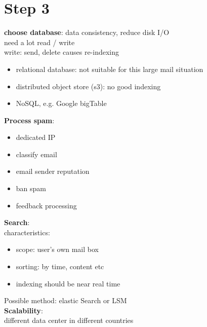 \documentclass{article}
\begin{document}
\section{Step 3}
\textbf{choose database}: data consistency, reduce disk I/O\\
need a lot read / write\\
write: send, delete causes re-indexing\\
\begin{itemize}
    \item relational database: not suitable for this large mail situation
    \item distributed object store (s3): no good indexing
    \item NoSQL, e.g. Google bigTable
\end{itemize}
\textbf{Process spam}:\\
\begin{itemize}
    \item dedicated IP
    \item classify email
    \item email sender reputation
    \item ban spam
    \item feedback processing
\end{itemize}
\textbf{Search}:\\
characteristics:
\begin{itemize}
    \item scope: user's own mail box
    \item sorting: by time, content etc
    \item indexing should be near real time
\end{itemize}
Possible method: elastic Search or LSM\\
\textbf{Scalability}:\\
different data center in different countries
\end{document}
